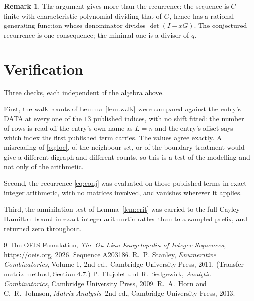 \documentclass[11pt,a4paper]{article}
\theoremstyle{plain}
\theoremstyle{definition}
\newtheorem{remark}[theorem]{Remark}
\begin{document}
\begin{remark}
The argument gives more than the recurrence: the sequence is $C$-finite with characteristic
polynomial dividing that of $G$, hence has a rational generating function whose denominator
divides $\det(I-xG)$. The conjectured recurrence is one consequence; the minimal one is a
divisor of $q$.
\end{remark}

\section{Verification}

Three checks, each independent of the algebra above.

First, the walk counts of Lemma~\ref{lem:walk} were compared against the entry's DATA at
every one of the $13$ published indices, with no shift fitted: the number of rows is
read off the entry's own name as $L=n$ and the entry's offset says which index the first
published term carries. The values agree exactly. A misreading of \eqref{eq:loc}, of the
neighbour set, or of the boundary treatment would give a different digraph and different
counts, so this is a test of the modelling and not only of the arithmetic.

Second, the recurrence \eqref{eq:conj} was evaluated on those published terms in exact
integer arithmetic, with no matrices involved, and vanishes wherever it applies.

Third, the annihilation test of Lemma~\ref{lem:crit} was carried to the full
Cayley--Hamilton bound in exact integer arithmetic rather than to a sampled prefix, and
returned zero throughout.

\begin{thebibliography}{9}
 The OEIS Foundation, \emph{The On-Line Encyclopedia of Integer
Sequences}, \url{https://oeis.org}, 2026. Sequence A203186.
 R.~P.~Stanley, \emph{Enumerative Combinatorics}, Volume 1, 2nd ed.,
Cambridge University Press, 2011. (Transfer-matrix method, Section 4.7.)
 P.~Flajolet and R.~Sedgewick, \emph{Analytic Combinatorics}, Cambridge
University Press, 2009.
 R.~A.~Horn and C.~R.~Johnson, \emph{Matrix Analysis}, 2nd ed., Cambridge
University Press, 2013.
\end{thebibliography}
\end{document}
